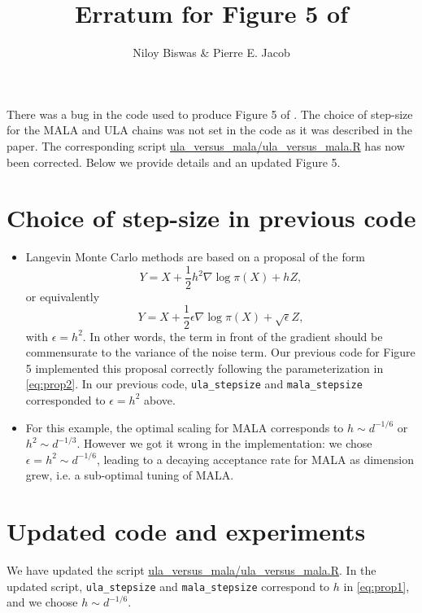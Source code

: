 \documentclass{article}
\title{Erratum for Figure 5 of \citeauthor{biswas_2019}}
\author{Niloy Biswas \& Pierre E. Jacob}
\begin{document}
\maketitle

There was a bug in the code used to produce Figure 5 of \citet{biswas_2019}. 
The choice of step-size for the MALA and ULA chains was not set in the code as it was described in 
the paper. The corresponding script 
\href{https://github.com/niloyb/LlagCouplings/blob/master/ula_versus_mala/ula_versus_mala.R}{ula\_versus\_mala/ula\_versus\_mala.R} 
has now been corrected.  Below we provide details and an updated  Figure 5.  

\section{Choice of step-size in previous code}
\begin{itemize}
  \item Langevin Monte Carlo methods are based on a proposal of the form 
    \begin{equation} \label{eq:prop1}
        Y = X + \frac{1}{2}  h^2  \nabla \log \pi (X) + h Z, 
    \end{equation}
    or equivalently 
    \begin{equation} \label{eq:prop2}
        Y = X + \frac{1}{2}  \epsilon  \nabla \log \pi (X) + \sqrt{\epsilon} Z, 
    \end{equation}
    with $\epsilon = h^2$. In other words, the term in front of the gradient
    should be commensurate to the variance of the noise term.  Our previous code for Figure 5
    implemented this proposal correctly following the parameterization in \eqref{eq:prop2}. 
    In our previous code, \texttt{ula\_stepsize} and \texttt{mala\_stepsize} corresponded to $\epsilon = h^2$ above.
    \item For this example, the optimal scaling for MALA corresponds to $h \sim d^{-1/6}$ or $h^2 \sim d^{-1/3}$.
    However we got it wrong in the implementation: we chose $\epsilon = h^2 \sim d^{-1/6}$, leading to a decaying acceptance rate for MALA as dimension grew, i.e. a sub-optimal tuning of MALA.
\end{itemize}

\section{Updated code and experiments}
We have updated the script
\href{https://github.com/niloyb/LlagCouplings/blob/master/ula_versus_mala/ula_versus_mala.R}{ula\_versus\_mala/ula\_versus\_mala.R}. 
In the updated script,  \texttt{ula\_stepsize} and \texttt{mala\_stepsize} correspond to $h$ in \eqref{eq:prop1}, 
and we choose $h \sim d^{-1/6}$. 
\end{document}
